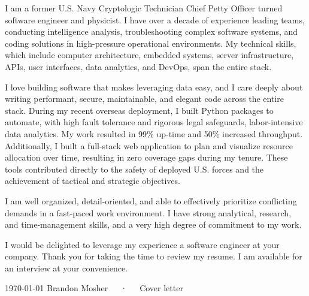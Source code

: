 \documentclass[11pt, a4paper]{coverletter}
\newenvironment{coverletter}{}{}
\newenvironment{paragraphs}{}{}
\begin{document}
\begin{header}
\address{Brooklyn, NY}
\mobile{}
\makeheader[C]
\end{header}
\begin{coverletter}
\begin{opening}
\makeletterstart
\end{opening}
\begin{body}
\setlength{\parindent}{0em}
\setlength{\parskip}{1em}
{\begin{paragraphs}
I am a former U.S. Navy Cryptologic Technician Chief Petty Officer turned software engineer and physicist. I have over a decade of experience leading teams, conducting intelligence analysis, troubleshooting complex software systems, and coding solutions in high-pressure operational environments. My technical skills, which include computer architecture, embedded systems, server infrastructure, APIs, user interfaces, data analytics, and DevOps, span the entire stack.\par
\end{paragraphs}}
\setlength{\parindent}{0em}
\setlength{\parskip}{1em}
{\begin{paragraphs}
I love building software that makes leveraging data easy, and I care deeply about writing performant, secure, maintainable, and elegant code across the entire stack. During my recent overseas deployment, I built Python packages to automate, with high fault tolerance and rigorous legal safeguards, labor-intensive data analytics. My work resulted in 99\% up-time and 50\% increased throughput. Additionally, I built a full-stack web application to plan and visualize resource allocation over time, resulting in zero coverage gaps during my tenure. These tools contributed directly to the safety of deployed U.S. forces and the achievement of tactical and strategic objectives.\par
I am well organized, detail-oriented, and able to effectively prioritize conflicting demands in a fast-paced work environment. I have strong analytical, research, and time-management skills, and a very high degree of commitment to my work.\par
I would be delighted to leverage my experience a software engineer at your company. Thank you for taking the time to review my resume. I am available for an interview at your convenience.\par
\end{paragraphs}}
\end{body}
\begin{closing}
\makeletterend
\end{closing}
\begin{enclosures}
\end{enclosures}
\end{coverletter}
\makefooter
{\today}
{Brandon Mosher~~~·~~~Cover letter}
{\thepage}
\end{document}
